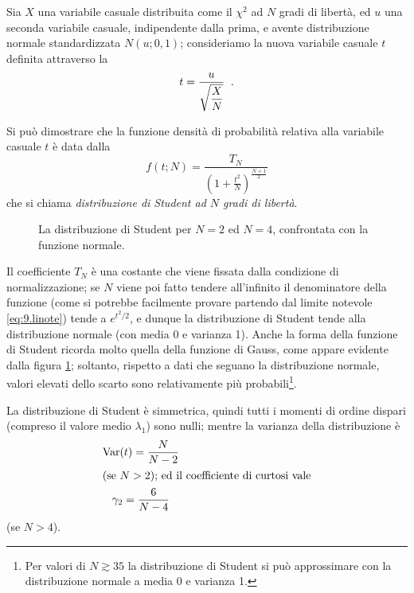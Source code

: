 %
Sia $X$ una variabile casuale distribuita come il $\chi^2$
ad $N$ gradi di libert\`a, ed $u$ una seconda variabile
casuale, indipendente dalla prima, e avente distribuzione
normale standardizzata $N(u;0,1)$; consideriamo la nuova
variabile casuale $t$ definita attraverso la
\begin{equation} \label{eq:12.stuvar}
  t = \frac{u}{\sqrt{\dfrac{X}{N}}} \;\; .
\end{equation}

Si pu\`o dimostrare che la funzione densit\`a di
probabilit\`a relativa alla variabile casuale $t$ \`e data
dalla
\begin{equation*}
  f(t;N) = \frac{T_N}{\left( 1 + \frac{t^2}{N}
    \right)^{\frac{N + 1}{2}}}
\end{equation*}
che si chiama \emph{distribuzione di Student ad $N$ gradi di
  libert\`a}.

\begin{figure}[hbtp]
  \vspace*{2ex}
  \begin{center} {
    
  } \end{center}
  \caption[La distribuzione di Student]
    {La distribuzione di Student per $N=2$ ed $N=4$,
    confrontata con la funzione normale.}
  \label{fig:12.student}
\end{figure}

Il coefficiente $T_N$ \`e una costante che viene fissata
dalla condizione di normalizzazione; se $N$ viene poi fatto
tendere all'infinito il denominatore della funzione (come si
potrebbe facilmente provare partendo dal limite notevole
\eqref{eq:9.linote}) tende a $e^{t^2/2}$, e dunque la
distribuzione di Student tende alla distribuzione normale
(con media 0 e varianza 1).%
Anche la forma della funzione di Student ricorda molto
quella della funzione di Gauss, come appare evidente dalla
figura \ref{fig:12.student}; soltanto, rispetto a dati che
seguano la distribuzione normale, valori elevati dello
scarto sono relativamente pi\`u probabili\/\footnote{Per
  valori di $N \gtrsim 35$ la distribuzione di Student si
  pu\`o approssimare con la distribuzione normale a media 0
  e varianza 1.}.

La distribuzione di Student \`e simmetrica, quindi tutti i
momenti di ordine dispari (compreso il valore medio
$\lambda_1$) sono nulli; mentre la varianza della
distribuzione \`e
\begin{gather*}
  \operatorname{Var}(t) = \frac{N}{N-2} \\
  \intertext{(se $N > 2$); ed il coefficiente di
    curtosi vale}
  \gamma_2 = \frac{6}{N-4}
\end{gather*}
(se $N > 4$).

